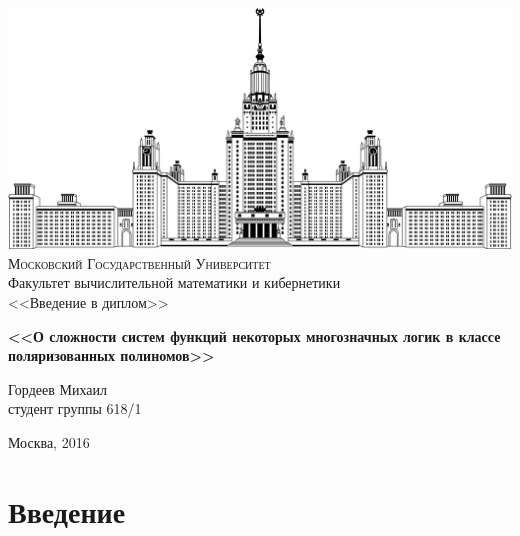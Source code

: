 \documentclass [12pt, a4paper] {article}
\begin{document}
\thispagestyle {empty}

\begin {center}
\vspace{-4cm}

\includegraphics [width = 0.5 \textwidth] {msu.png} \\
{\scshape Московский Государственный Университет} \\
Факультет вычислительной математики и кибернетики\\

\vspace {5cm}
{\LARGE <<Введение в диплом>> }

\vspace {1cm}

{\Huge \bfseries
<<О сложности систем функций некоторых многозначных логик в классе
    поляризованных полиномов>> \\}
\end {center}

\vfill
\vfill

\begin {flushright}
  \large
  Гордеев Михаил \\
  студент группы 618/1 \\

  \vspace {5mm}
\end {flushright}

\vfill

\begin {center}
Москва, 2016
\end {center}

\enlargethispage {4 \baselineskip}

\newpage
\section{Введение}
\end{document}
